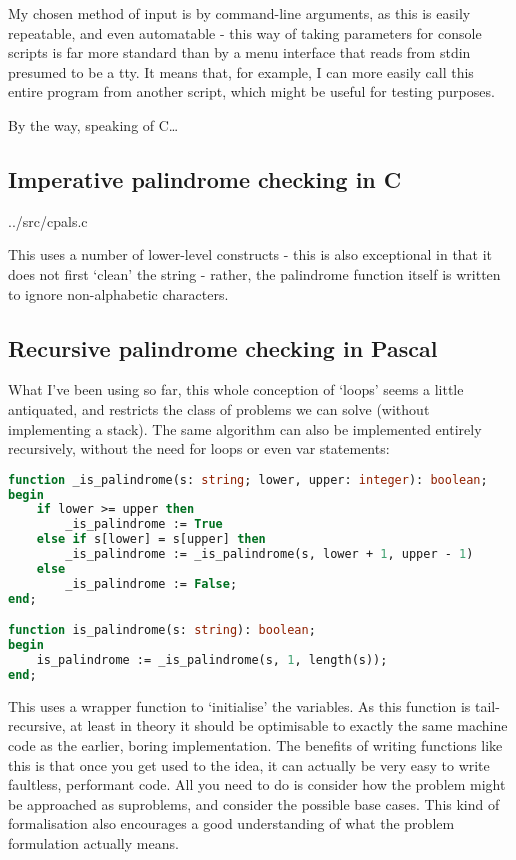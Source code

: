 \documentclass[fleqn,a4paper,11pt]{article}
\begin{document}
    My chosen method of input is by command-line arguments, as this is easily
    repeatable, and even automatable - this way of taking parameters for console
    scripts is far more standard than by a menu interface that reads from stdin
    presumed to be a tty. It means that, for example, I can more easily call
    this entire program from another script, which might be useful for testing
    purposes.

    By the way, speaking of C\ldots

    \subsection{Imperative palindrome checking in C}


{../src/cpals.c}

    This uses a number of lower-level constructs - this is also exceptional in
    that it does not first `clean' the string - rather, the palindrome function
    itself is written to ignore non-alphabetic characters.

    \subsection{Recursive palindrome checking in Pascal}

    What I've been using so far, this whole conception of `loops' seems a little
    antiquated, and restricts the class of problems we can solve (without
    implementing a stack). The same algorithm can also be implemented entirely
    recursively, without the need for loops or even var statements:

\begin{lstlisting}[language=Pascal, caption=Recursive palindrome function in Pascal]
function _is_palindrome(s: string; lower, upper: integer): boolean;
begin
    if lower >= upper then
        _is_palindrome := True
    else if s[lower] = s[upper] then
        _is_palindrome := _is_palindrome(s, lower + 1, upper - 1)
    else
        _is_palindrome := False;
end;

function is_palindrome(s: string): boolean;
begin
    is_palindrome := _is_palindrome(s, 1, length(s));
end;
\end{lstlisting}

    This uses a wrapper function to `initialise' the variables. As this function
    is tail-recursive, at least in theory it should be optimisable to exactly
    the same machine code as the earlier, boring implementation. The benefits of
    writing functions like this is that once you get used to the idea, it can
    actually be very easy to write faultless, performant code. All you need to
    do is consider how the problem might be approached as suproblems, and
    consider the possible base cases. This kind of formalisation also encourages
    a good understanding of what the problem formulation actually means.
\end{document}
